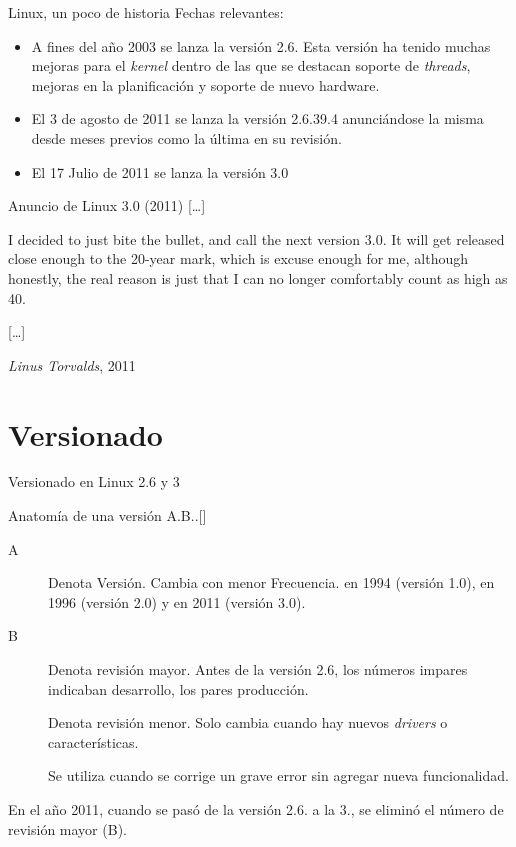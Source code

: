 \begin{frame}{Linux, un poco de historia}
Fechas relevantes:
\begin{itemize}
\item A fines del año 2003 se lanza la versión 2.6. Esta versión ha tenido
  muchas mejoras para el \textit{kernel} dentro de las que se destacan
  soporte de \textit{threads}, mejoras en la planificación y soporte de
  nuevo hardware.

\item El 3 de agosto de 2011 se lanza la versión 2.6.39.4 anunciándose la
  misma desde meses previos como la última en su revisión.

\item El 17 Julio de 2011 se lanza la versión 3.0
\end{itemize}
\begin{block}{\alert{Anuncio de Linux 3.0} \hfill (2011)}
  [\ldots]

  I decided to just bite the bullet, and call the next version 3.0. It will
  get released close enough to the 20-year mark, which is excuse enough for
  me, although honestly, the real reason is just that I can no longer
  comfortably count as high as 40.

  [\ldots]

  \hfill \emph{Linus Torvalds},  2011 \cite{Torvalds2011}
\end{block}
\end{frame}

\section{Versionado}
\begin{frame}{Versionado en Linux 2.6 y 3}
  \begin{block}{Anatomía de una versión}
    \alert{A}.\alert{B}..[]
  \end{block}

  \begin{description}

  \item[\alert{A}] Denota Versión. Cambia con menor Frecuencia. en 1994
    (versión 1.0), en 1996 (versión 2.0) y en 2011 (versión 3.0).

  \item[\alert{B}] Denota revisión mayor. Antes de la versión 2.6, los
    números impares indicaban desarrollo, los pares producción.

  \item[] Denota revisión menor. Solo cambia cuando hay nuevos
    \textit{drivers} o características.

  \item[] Se utiliza cuando se corrige un grave error sin
    agregar nueva funcionalidad.
  \end{description}

  \vfill \pause En el año 2011, cuando se pasó de la versión
  \alert{2}.\alert{6}. a la \alert{3}., se
  eliminó el número de revisión mayor (\alert{B})\cite{Torvalds2011}.

\end{frame}


